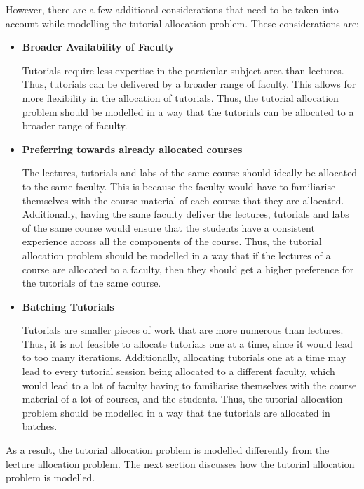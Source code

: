 However, there are a few additional considerations that need to be taken into account while modelling the tutorial allocation problem. These considerations are:

\begin{itemize}
  \item \textbf{Broader Availability of Faculty}

        Tutorials require less expertise in the particular subject area than lectures. Thus, tutorials can be delivered by a broader range of faculty. This allows for more flexibility in the allocation of tutorials. Thus, the tutorial allocation problem should be modelled in a way that the tutorials can be allocated to a broader range of faculty.

  \item \textbf{Preferring towards already allocated courses}

        The lectures, tutorials and labs of the same course should ideally be allocated to the same faculty. This is because the faculty would have to familiarise themselves with the course material of each course that they are allocated. Additionally, having the same faculty deliver the lectures, tutorials and labs of the same course would ensure that the students have a consistent experience across all the components of the course. Thus, the tutorial allocation problem should be modelled in a way that if the lectures of a course are allocated to a faculty, then they should get a higher preference for the tutorials of the same course.

  \item \textbf{Batching Tutorials}

        Tutorials are smaller pieces of work that are more numerous than lectures. Thus, it is not feasible to allocate tutorials one at a time, since it would lead to too many iterations. Additionally, allocating tutorials one at a time may lead to every tutorial session being allocated to a different faculty, which would lead to a lot of faculty having to familiarise themselves with the course material of a lot of courses, and the students. Thus, the tutorial allocation problem should be modelled in a way that the tutorials are allocated in batches.

\end{itemize}

As a result, the tutorial allocation problem is modelled differently from the lecture allocation problem. The next section discusses how the tutorial allocation problem is modelled.

